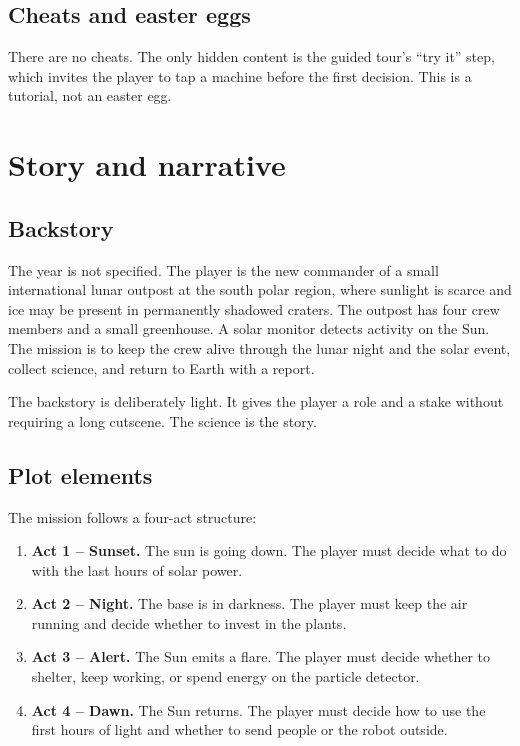 \documentclass[11pt,a4paper]{article}
\begin{document}
\subsection{Cheats and easter eggs}

There are no cheats. The only hidden content is the guided tour's ``try it'' step, which invites the player to tap a machine before the first decision. This is a tutorial, not an easter egg.

\section{Story and narrative}

\subsection{Backstory}

The year is not specified. The player is the new commander of a small international lunar outpost at the south polar region, where sunlight is scarce and ice may be present in permanently shadowed craters. The outpost has four crew members and a small greenhouse. A solar monitor detects activity on the Sun. The mission is to keep the crew alive through the lunar night and the solar event, collect science, and return to Earth with a report.

The backstory is deliberately light. It gives the player a role and a stake without requiring a long cutscene. The science is the story.

\subsection{Plot elements}

The mission follows a four-act structure:

\begin{enumerate}
  \item \textbf{Act 1 -- Sunset.} The sun is going down. The player must decide what to do with the last hours of solar power.
  \item \textbf{Act 2 -- Night.} The base is in darkness. The player must keep the air running and decide whether to invest in the plants.
  \item \textbf{Act 3 -- Alert.} The Sun emits a flare. The player must decide whether to shelter, keep working, or spend energy on the particle detector.
  \item \textbf{Act 4 -- Dawn.} The Sun returns. The player must decide how to use the first hours of light and whether to send people or the robot outside.
\end{enumerate}
\end{document}
